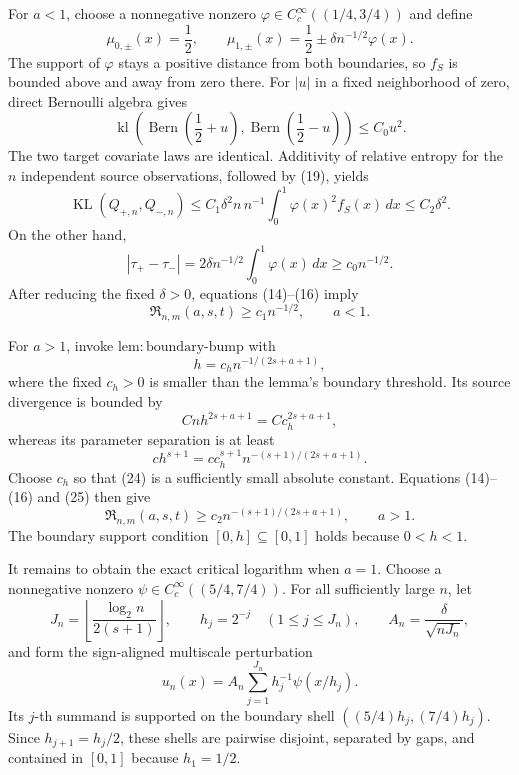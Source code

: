 For \(a<1\), choose a nonnegative nonzero \(\varphi\in C_c^\infty((1/4,3/4))\) and define
\[
 \mu_{0,\pm}(x)=\frac12,
 \qquad
 \mu_{1,\pm}(x)=\frac12\pm\delta n^{-1/2}\varphi(x).
 \tag{18}
\]
The support of \(\varphi\) stays a positive distance from both boundaries, so \(f_S\) is bounded above and away from zero there.  For \(|u|\) in a fixed neighborhood of zero, direct Bernoulli algebra gives
\[
 \operatorname{kl}\!\left(\operatorname{Bern}\!\left(\frac12+u\right),
 \operatorname{Bern}\!\left(\frac12-u\right)\right)\leq C_0u^2.
 \tag{19}
\]
The two target covariate laws are identical.  Additivity of relative entropy for the \(n\) independent source observations, followed by (19), yields
\[
 \operatorname{KL}(Q_{+,n},Q_{-,n})
 \leq C_1\delta^2 n\,n^{-1}\int_0^1\varphi(x)^2f_S(x)\,dx
 \leq C_2\delta^2.
 \tag{20}
\]
On the other hand,
\[
 |\tau_+-\tau_-|
 =2\delta n^{-1/2}\int_0^1\varphi(x)\,dx
 \geq c_0n^{-1/2}.
 \tag{21}
\]
After reducing the fixed \(\delta>0\), equations (14)--(16) imply
\[
 \mathfrak R_{n,m}(a,s,t)\geq c_1n^{-1/2},
 \qquad a<1.
 \tag{22}
\]

For \(a>1\), invoke \(\mathrm{lem:boundary\text{-}bump}\) with
\[
 h=c_hn^{-1/(2s+a+1)},
 \tag{23}
\]
where the fixed \(c_h>0\) is smaller than the lemma's boundary threshold.  Its source divergence is bounded by
\[
 Cnh^{2s+a+1}=Cc_h^{2s+a+1},
 \tag{24}
\]
whereas its parameter separation is at least
\[
 c h^{s+1}
 =c c_h^{s+1}n^{-(s+1)/(2s+a+1)}.
 \tag{25}
\]
Choose \(c_h\) so that (24) is a sufficiently small absolute constant.  Equations (14)--(16) and (25) then give
\[
 \mathfrak R_{n,m}(a,s,t)
 \geq c_2n^{-(s+1)/(2s+a+1)},
 \qquad a>1.
 \tag{26}
\]
The boundary support condition \([0,h]\subseteq[0,1]\) holds because \(0<h<1\).

It remains to obtain the exact critical logarithm when \(a=1\).  Choose a nonnegative nonzero \(\psi\in C_c^\infty((5/4,7/4))\).  For all sufficiently large \(n\), let
\[
 J_n=\left\lfloor\frac{\log_2 n}{2(s+1)}\right\rfloor,
 \qquad h_j=2^{-j}\quad(1\leq j\leq J_n),
 \qquad A_n=\frac{\delta}{\sqrt{nJ_n}},
 \tag{27}
\]
and form the sign-aligned multiscale perturbation
\[
 u_n(x)=A_n\sum_{j=1}^{J_n}h_j^{-1}\psi(x/h_j).
 \tag{28}
\]
Its \(j\)-th summand is supported on the boundary shell \(((5/4)h_j,(7/4)h_j)\).  Since \(h_{j+1}=h_j/2\), these shells are pairwise disjoint, separated by gaps, and contained in \([0,1]\) because \(h_1=1/2\).

